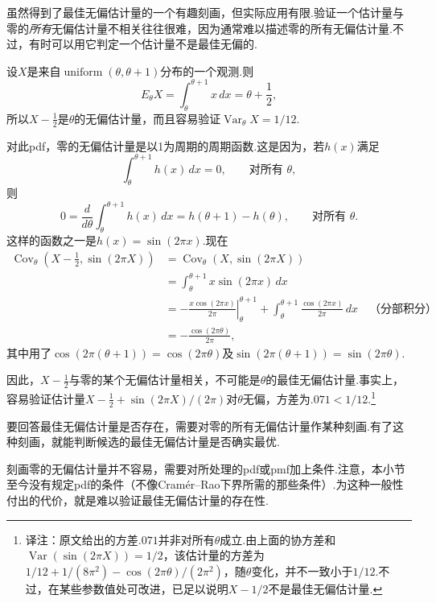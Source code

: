 虽然得到了最佳无偏估计量的一个有趣刻画，但实际应用有限.验证一个估计量与零的\emph{所有}无偏估计量不相关往往很难，因为通常难以描述零的所有无偏估计量.不过，有时可以用它判定一个估计量不是最佳无偏的.
\begin{example}[零的无偏估计量]\label{ex:7.3.21}
设$X$是来自$\operatorname{uniform}(\theta,\theta+1)$分布的一个观测.则
$$E_\theta X=\int_\theta^{\theta+1}x\,dx=\theta+\frac12,$$
所以$X-\frac12$是$\theta$的无偏估计量，而且容易验证$\operatorname{Var}_\theta X=1/12$.

对此pdf，零的无偏估计量是以1为周期的周期函数.这是因为，若$h(x)$满足
$$\int_\theta^{\theta+1}h(x)\,dx=0,\qquad\text{对所有 }\theta,$$
则
$$0=\frac d{d\theta}\int_\theta^{\theta+1}h(x)\,dx=h(\theta+1)-h(\theta),\qquad\text{对所有 }\theta.$$
这样的函数之一是$h(x)=\sin(2\pi x)$.现在
\begin{align*}
\operatorname{Cov}_\theta\left(X-\frac12,\sin(2\pi X)\right)
&=\operatorname{Cov}_\theta(X,\sin(2\pi X))\\
&=\int_\theta^{\theta+1}x\sin(2\pi x)\,dx\\
&=\left.-\frac{x\cos(2\pi x)}{2\pi}\right|_\theta^{\theta+1}+\int_\theta^{\theta+1}\frac{\cos(2\pi x)}{2\pi}\,dx\quad\text{（分部积分）}\\
&=-\frac{\cos(2\pi\theta)}{2\pi},
\end{align*}
其中用了$\cos(2\pi(\theta+1))=\cos(2\pi\theta)$及$\sin(2\pi(\theta+1))=\sin(2\pi\theta)$.

因此，$X-\frac12$与零的某个无偏估计量相关，不可能是$\theta$的最佳无偏估计量.事实上，容易验证估计量$X-\frac12+\sin(2\pi X)/(2\pi)$对$\theta$无偏，方差为$.071<1/12$.\footnote{译注：原文给出的方差$.071$并非对所有$\theta$成立.由上面的协方差和$\operatorname{Var}(\sin(2\pi X))=1/2$，该估计量的方差为$1/12+1/(8\pi^2)-\cos(2\pi\theta)/(2\pi^2)$，随$\theta$变化，并不一致小于$1/12$.不过，在某些参数值处可改进，已足以说明$X-1/2$不是最佳无偏估计量.}
\end{example}
要回答最佳无偏估计量是否存在，需要对零的所有无偏估计量作某种刻画.有了这种刻画，就能判断候选的最佳无偏估计量是否确实最优.

刻画零的无偏估计量并不容易，需要对所处理的pdf或pmf加上条件.注意，本小节至今没有规定pdf的条件（不像Cramér--Rao下界所需的那些条件）.为这种一般性付出的代价，就是难以验证最佳无偏估计量的存在性.

